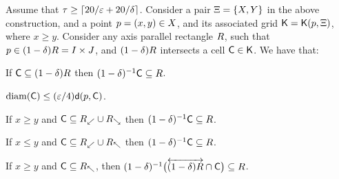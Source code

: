 \documentclass[12pt]{article}%
\begin{document}
\begin{lemma}
    Assume that $\tau \geq \left\lceil {20/\varepsilon+ 20/\delta} \right\rceil$.  Consider a
    pair $\Xi = \{X, Y \}$ in the above construction, and a
    point $p =(x,y) \in X$, and its associated grid
    $\mathsf{K} = \mathsf{K}(p, \Xi)$, where $x \geq y$. Consider any axis
    parallel rectangle $R$, such that
    $p \in (1-\delta)R = I\times J$, and $(1-\delta)R$
    intersects a cell $\mathsf{C} \in \mathsf{K}$. We have that:
    \begin{compactenumI}
        \smallskip%
        \item {} If $\mathsf{C} \subseteq (1-\delta)R$ then
        $(1-\delta)^{-1} \mathsf{C} \subseteq R$.

        \item {}
        $\diameterX{\cell} \leq (\eps/4) \dsY{\pa}{\cell}$.

        \item    {} If $x \geq y$ and
        $\mathsf{C} \subseteq R_\swarrow \cup R_\searrow$ then
        $(1-\delta)^{-1} \mathsf{C} \subseteq R$.

        \item {} If $x \leq y$ and
        $\mathsf{C} \subseteq R_\swarrow \cup R_\nwarrow$ then
        $(1-\delta)^{-1} \mathsf{C} \subseteq R$.

        \smallskip%
        \item {} If $x \geq y$ and
        $\mathsf{C} \subseteq R_\nwarrow$, then
        $(1-\delta)^{-1} \bigl(\overleftrightarrow{ (1-\delta)R} \cap \mathsf{C}
        \bigr) \subseteq R$.



    \end{compactenumI}
\end{lemma}
\end{document}
